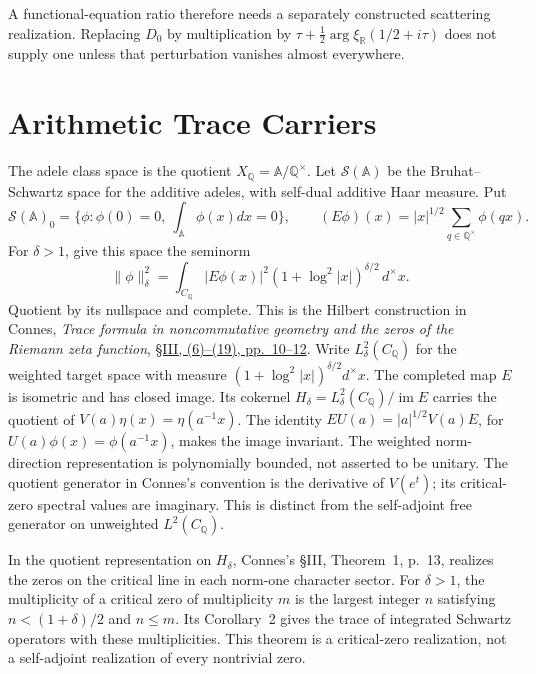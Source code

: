 A functional-equation ratio therefore needs a separately constructed
scattering realization. Replacing \(D_0\) by multiplication by
\(\tau+\tfrac12\arg\xi_{\mathbb R}(1/2+i\tau)\) does not supply
one unless that perturbation vanishes almost everywhere.

\section{Arithmetic Trace Carriers}
\label{v4-arith:w7-j:nc-residual}
\label{v4-arith:w7-j:connes-reduction}
\label{v4-arith:w7-j:sources}

\begin{definition}
\label{v4-arith:w7-j:def:connes-ac-space}
The adele class space is the quotient
\(X_{\mathbb Q}=\mathbb A/\mathbb Q^\times\).
Let \(\mathscr S(\mathbb A)\) be the Bruhat--Schwartz space for the
additive adeles, with self-dual additive Haar measure. Put
\[
 \mathscr S(\mathbb A)_0
 =\{\phi:\phi(0)=0,\ \int_{\mathbb A}\phi(x)dx=0\},\qquad
 (E\phi)(x)=|x|^{1/2}\sum_{q\in\mathbb Q^\times}\phi(qx).
\]
For \(\delta>1\), give this space the seminorm
\[
 \|\phi\|_\delta^2
 =\int_{C_{\mathbb Q}}|E\phi(x)|^2
 (1+\log^2|x|)^{\delta/2}\,d^\times x.
\]
Quotient by its nullspace and complete. This is the Hilbert
construction in Connes, \emph{Trace formula in noncommutative
geometry and the zeros of the Riemann zeta function},
\href{https://arxiv.org/pdf/math/9811068}{\S III, (6)--(19), pp.~10--12}.
Write \(L^2_\delta(C_{\mathbb Q})\) for the weighted target space
with measure \((1+\log^2|x|)^{\delta/2}d^\times x\).
The completed map \(E\) is isometric and has closed image.
Its cokernel \(H_\delta=L^2_\delta(C_{\mathbb Q})/\operatorname{im}E\)
carries the quotient of \(V(a)\eta(x)=\eta(a^{-1}x)\).
The identity \(EU(a)=|a|^{1/2}V(a)E\), for
\(U(a)\phi(x)=\phi(a^{-1}x)\), makes the image invariant.
The weighted norm-direction representation is polynomially bounded,
not asserted to be unitary. The quotient generator in Connes's
convention is the derivative of \(V(e^t)\); its critical-zero
spectral values are imaginary. This is distinct from the
self-adjoint free generator on unweighted \(L^2(C_{\mathbb Q})\).
\end{definition}

\begin{proposition}
\label{v4-arith:w7-j:prop:connes-absorption}
In the quotient representation on \(H_\delta\), Connes's \S III, Theorem~1, p.~13, realizes the zeros
on the critical line in each norm-one character sector.
For \(\delta>1\), the multiplicity of a critical zero of
multiplicity \(m\) is the largest integer \(n\) satisfying
\(n<(1+\delta)/2\) and \(n\leq m\).
Its Corollary~2 gives the trace of integrated Schwartz operators
with these multiplicities. This theorem is a critical-zero
realization, not a self-adjoint realization of every nontrivial zero.
\end{proposition}

